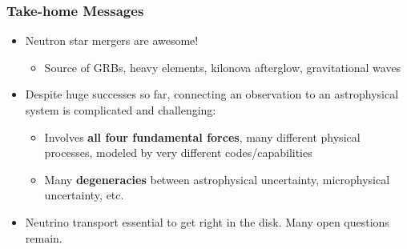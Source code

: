 \documentclass[]{beamer}
\begin{document}
\begin{frame}
  \frametitle{Take-home Messages}
  \begin{itemize}
  \item Neutron star mergers are awesome!
    \begin{itemize}
    \item Source of GRBs, heavy elements, kilonova afterglow,
      gravitational waves
    \end{itemize}
  \item Despite huge successes so far, connecting an observation to an
    astrophysical system is complicated and challenging:
    \begin{itemize}
    \item Involves \textbf{all four fundamental forces}, many different physical processes, modeled by very different codes/capabilities
    \item Many \textbf{degeneracies} between astrophysical uncertainty, microphysical uncertainty, etc.
    \end{itemize}
  \item Neutrino transport essential to get right in the disk. Many open questions remain.
  \end{itemize}
\end{frame}

\end{document}

